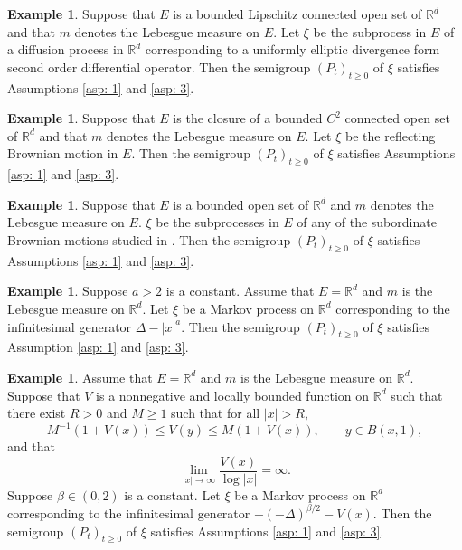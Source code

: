\documentclass[12pt,a4paper]{amsart}
\theoremstyle{definition}
\newtheorem{exa}[thm]{Example}
\numberwithin{equation}{section}
\begin{document}
\begin{exa} {\rm
Suppose that $E$ is a bounded Lipschitz connected  open set of $\mathbb R^d$ and that $m$ denotes the Lebesgue measure on $E$.
Let $\xi$ be the subprocess in $E$ of a diffusion
process in $\mathbb{R}^d$ corresponding to a uniformly elliptic divergence form second order
differential operator.  Then the semigroup $(P_t)_{t\ge 0}$ of $\xi$ satisfies
Assumptions \ref{asp: 1} and \ref{asp: 3}. 
}
\end{exa}

\begin{exa} {\rm
Suppose that $E$ is the closure of a bounded $C^2$ connected  open set of $\mathbb R^d$ and that $m$ denotes the Lebesgue measure on $E$.
Let $\xi$ be the reflecting Brownian motion
in $E$. Then the semigroup $(P_t)_{t\ge 0}$ of $\xi$ satisfies
Assumptions \ref{asp: 1} and \ref{asp: 3}. 
}
\end{exa}

\begin{exa} {\rm
Suppose that $E$ is a bounded   open set of $\mathbb R^d$ and  $m$ denotes the Lebesgue measure on $E$.
$\xi$ be the subprocesses in $E$ of any of
the subordinate Brownian motions studied in \cite{KSV1, KSV2}.  Then the semigroup $(P_t)_{t\ge 0}$ of $\xi$ satisfies
Assumptions \ref{asp: 1} and \ref{asp: 3}. 
}
\end{exa}

\begin{exa} {\rm
Suppose $a>2$ is a constant.
Assume that $E=\mathbb{R}^d$ and $m$ is the Lebesgue measure on $\mathbb{R}^d$.
Let $\xi$ be a Markov process on $\mathbb{R}^d$ corresponding to the infinitesimal
generator $\Delta-|x|^a$. Then the semigroup $(P_t)_{t\ge 0}$ of $\xi$ satisfies
Assumption \ref{asp: 1} and \ref{asp: 3}. 
}
\end{exa}

\begin{exa} {\rm
Assume that $E=\mathbb{R}^d$ and $m$ is the Lebesgue measure on $\mathbb{R}^d$.
Suppose that $V$ is a nonnegative and locally bounded function on  $\mathbb{R}^d$
such that there exist $R>0$ and $M\ge 1$ such that for all $|x|>R$,
$$
M^{-1}(1+V(x))\le V(y)\le M(1+V(x)), \qquad y\in B(x, 1),
$$
and that
$$
\lim_{|x|\to\infty}\frac{V(x)}{\log|x|}=\infty.
$$
Suppose $\beta\in (0, 2)$ is a constant.
Let $\xi$ be a Markov process on $\mathbb{R}^d$ corresponding to the infinitesimal
generator $-(-\Delta)^{\beta/2}-V(x)$. 
Then the semigroup $(P_t)_{t\ge 0}$ of $\xi$ satisfies
Assumptions \ref{asp: 1} and \ref{asp: 3}. 
}
\end{exa}
\end{document}
